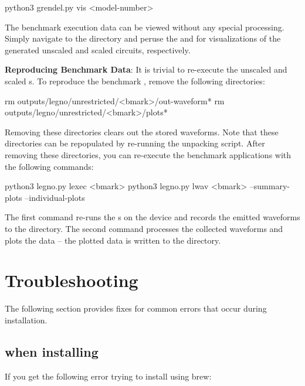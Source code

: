 \begin{snippet}
python3 grendel.py vis <model-number>
\end{snippet}

The benchmark execution data can be viewed without any special processing. Simply navigate to the 
 directory and peruse the  and  for visualizations of the 
generated unscaled and scaled circuits, respectively.

\noindent\textbf{Reproducing Benchmark Data}: It is trivial to re-execute the unscaled and scaled \adp{}s. To reproduce the
benchmark , remove the following directories:

\begin{snippet}
   rm outputs/legno/unrestricted/<bmark>/out-waveform*
   rm outputs/legno/unrestricted/<bmark>/plots*
\end{snippet}

Removing these directories clears out the stored waveforms. Note that these directories can be repopulated by re-running the
unpacking script. After removing these directories, you can re-execute the benchmark applications with the following commands:

\begin{snippet}
   python3 legno.py lexec <bmark>
   python3 legno.py lwav <bmark> --summary-plots --individual-plots
\end{snippet}

The first command re-runs the \adp{}s on the \hcdc{} device and records the emitted waveforms to the  directory. 
The second command processes the collected waveforms and plots the data -- the plotted data is written to the  directory.



\section{Troubleshooting}

The following section provides fixes for common errors that occur during
installation.

\subsection{ when installing }

\noindent If you get the following error trying to install
 using brew:

